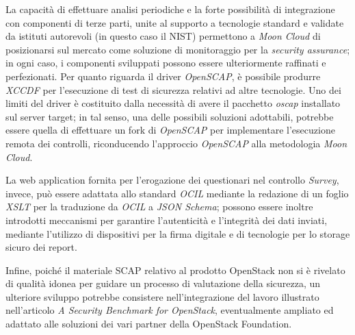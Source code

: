 \documentclass[../main.tex]{subfiles}
\begin{document}
La capacità di effettuare analisi periodiche e la forte possibilità di integrazione con componenti di terze parti, unite al supporto a tecnologie standard e validate da istituti autorevoli (in questo caso il NIST) permettono a \textit{Moon Cloud} di posizionarsi sul mercato come soluzione di monitoraggio per la \textit{security assurance}; 
in ogni caso, i componenti sviluppati possono essere ulteriormente raffinati e perfezionati.
Per quanto riguarda il driver \textit{OpenSCAP}, è possibile produrre \textit{XCCDF} per l'esecuzione di test di sicurezza relativi ad altre tecnologie.
Uno dei limiti del driver è costituito dalla necessità di avere il pacchetto \textit{oscap} installato sul server target; in tal senso, una delle possibili soluzioni adottabili, potrebbe essere quella di effettuare un fork di \textit{OpenSCAP} per implementare l'esecuzione remota dei controlli, riconducendo l'approccio \textit{OpenSCAP} alla metodologia \textit{Moon Cloud}.

La web application fornita per l'erogazione dei questionari nel controllo \textit{Survey}, invece, può essere adattata allo standard \textit{OCIL} mediante la redazione di un foglio \textit{XSLT} per la traduzione da \textit{OCIL} a \textit{JSON Schema}; possono essere inoltre introdotti meccanismi per garantire l'autenticità e l'integrità dei dati inviati, mediante l'utilizzo di dispositivi per la firma digitale e di tecnologie per lo storage sicuro dei report.

Infine, poiché il materiale SCAP relativo al prodotto OpenStack non si è rivelato di qualità idonea per guidare un processo di valutazione della sicurezza, un ulteriore sviluppo potrebbe consistere nell'integrazione del lavoro illustrato nell'articolo \textit{A Security Benchmark for OpenStack}, eventualmente ampliato ed adattato alle soluzioni dei vari partner della OpenStack Foundation.
\end{document}
